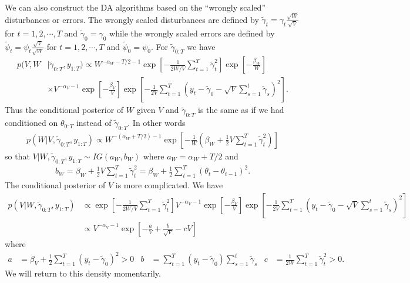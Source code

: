 \documentclass{article}
\begin{document}
We can also construct the DA algorithms based on the ``wrongly scaled'' disturbances or errors. The wrongly scaled disturbances are defined by $\tilde{\gamma}_t = \gamma_t\frac{\sqrt{W}}{\sqrt{V}}$ for $t=1,2,\cdots,T$ and $\tilde{\gamma}_0=\gamma_0$ while the wrongly scaled errors are defined by $\tilde{\psi}_t = \psi_t\frac{\sqrt{V}}{\sqrt{W}}$ for $t=1,2,\cdots,T$ and $\tilde{\psi}_0=\psi_0$. For $\tilde{\gamma}_{0:T}$ we have
\begin{align}
  p(V,W&|\tilde{\gamma}_{0:T},y_{1:T}) \propto W^{-\alpha_W - T/2 - 1}\exp\left[-\frac{1}{2W/V}\sum_{t=1}^T\tilde{\gamma}_t^2\right]\exp\left[-\frac{\beta_W}{W}\right]\nonumber\\
  &\times V^{-\alpha_V-1}\exp\left[-\frac{\beta_V}{V}\right]\exp\left[-\frac{1}{2V}\sum_{t=1}^T\left(y_t - \tilde{\gamma}_0 - \sqrt{V}\sum_{s=1}^t\tilde{\gamma}_s\right)^2\right].\label{llmwdistpost}
\end{align}
Thus the conditional posterior of $W$ given $V$ and $\tilde{\gamma}_{0:T}$ is the same as if we had conditioned on $\theta_{0:T}$ instead of $\tilde{\gamma}_{0:T}$. In other words
\begin{align*}
  p(W|V,\tilde{\gamma}_{0:T},y_{1:T}) \propto W^{-(\alpha_W + T/2) - 1}\exp\left[-\frac{1}{W}\left(\beta_W + \frac{1}{2}V\sum_{t=1}^T\tilde{\gamma}_t^2\right)\right]
\end{align*}
so that $V|W,\tilde{\gamma}_{0:T},y_{1:T}\sim IG(a_W, b_W)$ where $a_W = \alpha_W + T/2$ and 
\begin{align*}
  b_W = \beta_W + \frac{1}{2}V\sum_{t=1}^T\tilde{\gamma}_t^2 = \beta_W + \frac{1}{2}\sum_{t=1}^T(\theta_t - \theta_{t-1})^2.
\end{align*}
The conditional posterior of $V$ is more complicated. We have
\begin{align*}
  p(V|W,\tilde{\gamma}_{0:T},y_{1:T}) &\propto \exp\left[-\frac{1}{2W/V}\sum_{t=1}^T\tilde{\gamma}_t^2\right] V^{-\alpha_V-1}\exp\left[-\frac{\beta_V}{V}\right]\exp\left[-\frac{1}{2V}\sum_{t=1}^T\left(y_t - \tilde{\gamma}_0 - \sqrt{V}\sum_{s=1}^t\tilde{\gamma}_s\right)^2\right]\\
  &\propto V^{-\alpha_V - 1}\exp\left[-\frac{a}{V} + \frac{b}{\sqrt{V}} - cV\right]
\end{align*}
where 
\begin{align*}
  a & = \beta_V + \frac{1}{2}\sum_{t=1}^T(y_t - \tilde{\gamma}_0)^2 > 0 &
  b & = \sum_{t=1}^T(y_t - \tilde{\gamma}_0)\sum_{s=1}^t\tilde{\gamma}_s &
  c & = \frac{1}{2W}\sum_{t=1}^T\tilde{\gamma}_t^2 > 0.
\end{align*}
We will return to this density momentarily.
\end{document}

